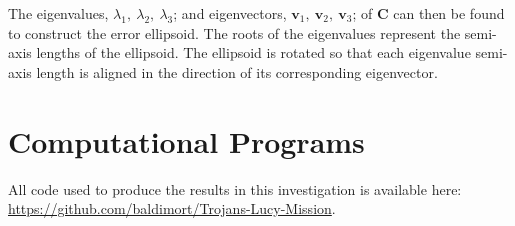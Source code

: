 \documentclass[10pt, twocolumn]{revtex4}    %
\begin{document}
The eigenvalues, $\lambda_1,\ \lambda_2,\ \lambda_3$; and eigenvectors, $\mathbf{v}_1,\ \mathbf{v}_2,\ \mathbf{v}_3$; of $\mathbf{C}$ can then be found to construct the error ellipsoid. The roots of the eigenvalues represent the semi-axis lengths of the ellipsoid. The ellipsoid is rotated so that each eigenvalue semi-axis length is aligned in the direction of its corresponding eigenvector.

\section{Computational Programs}

All code used to produce the results in this investigation is available here: \url{https://github.com/baldimort/Trojans-Lucy-Mission}.
\end{document}
